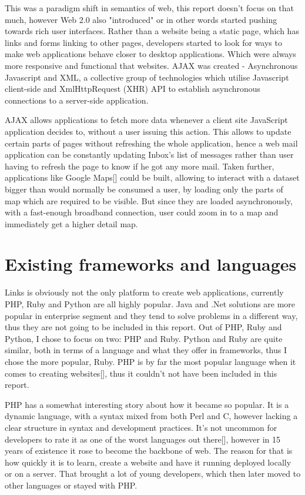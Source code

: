 This was a paradigm shift in semantics of web, this report doesn't focus on that much, however Web 2.0 also "introduced" or in other words started pushing towards rich user interfaces. Rather than a website being a static page, which has links and forms linking to other pages, developers started to look for ways to make web applications behave closer to desktop applications. Which were always more responsive and functional that websites. AJAX was created - Asynchronous Javascript and XML, a collective group of technologies which utilise Javascript client-side and XmlHttpRequest (XHR) API to establish asynchronous connections to a server-side application. 

AJAX allows applications to fetch more data whenever a client site JavaScript application decides to, without a user issuing this action. This allows to update certain parts of pages without refreshing the whole application, hence a web mail application can be constantly updating Inbox's list of messages rather than user having to refresh the page to know if he got any more mail. Taken further, applications like Google Maps[] could be built, allowing to interact with a dataset bigger than would normally be consumed a user, by loading only the parts of map which are required to be visible. But since they are loaded asynchronously, with a fast-enough broadband connection, user could zoom in to a map and immediately get a higher detail map.

\section{Existing frameworks and languages}

Links is obviously not the only platform to create web applications, currently PHP, Ruby and Python are all highly popular. Java and .Net solutions are more popular in enterprise segment and they tend to solve problems in a different way, thus they are not going to be included in this report. Out of PHP, Ruby and Python, I chose to focus on two: PHP and Ruby. Python and Ruby are quite similar, both in terms of a language and what they offer in frameworks, thus I chose the more popular, Ruby. PHP is by far the most popular language when it comes to creating websites[], thus it couldn't not have been included in this report. 

PHP has a somewhat interesting story about how it became so popular. It is a dynamic language, with a syntax mixed from both Perl and C, however lacking a clear structure in syntax and development practices. It's not uncommon for developers to rate it as one of the worst languages out there[], however in 15 years of existence it rose to become the backbone of web. The reason for that is how quickly it is to learn, create a website and have it running deployed locally or on a server. That brought a lot of young developers, which then later moved to other languages or stayed with PHP. 

